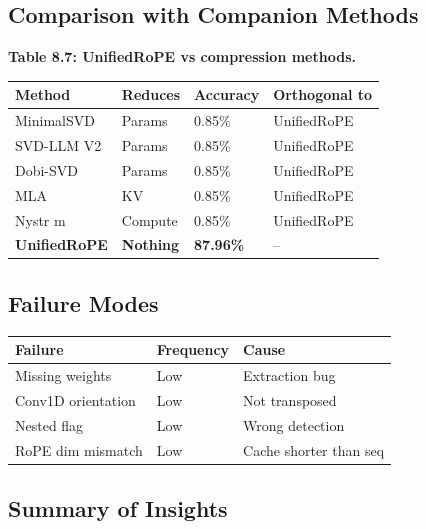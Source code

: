 \subsection{Comparison with Companion Methods}

\textbf{Table 8.7: UnifiedRoPE vs compression methods.}

\begin{table}[H]
\centering
\small
\begin{tabular}{llll}
\toprule
\textbf{Method} & \textbf{Reduces} & \textbf{Accuracy} & \textbf{Orthogonal to} \\
\midrule
MinimalSVD & Params & 0.85\% & UnifiedRoPE \\
SVD-LLM V2 & Params & 0.85\% & UnifiedRoPE \\
Dobi-SVD & Params & 0.85\% & UnifiedRoPE \\
MLA & KV & 0.85\% & UnifiedRoPE \\
Nystr m & Compute & 0.85\% & UnifiedRoPE \\
\textbf{UnifiedRoPE} & \textbf{Nothing} & \textbf{87.96\%} & -- \\
\bottomrule
\end{tabular}
\end{table}

\subsection{Failure Modes}

\begin{table}[H]
\centering
\small
\begin{tabular}{lll}
\toprule
\textbf{Failure} & \textbf{Frequency} & \textbf{Cause} \\
\midrule
Missing weights & Low & Extraction bug \\
Conv1D orientation & Low & Not transposed \\
Nested flag & Low & Wrong detection \\
RoPE dim mismatch & Low & Cache shorter than seq \\
\bottomrule
\end{tabular}
\end{table}

\subsection{Summary of Insights}

